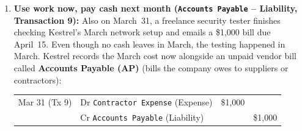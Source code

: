\begin{enumerate}
\begin{center}
\begin{tabular}{@{}llrr@{}}
                & \quad Cr \texttt{Cash} (Asset) & & \$1,200
  \end{tabular}
  \end{center}
  Each month starting in April, \$100 of coverage expires: Kestrel will Debit \texttt{Insurance Expense} \$100 and Credit \texttt{Prepaid Expenses} \$100.
  \item \textbf{Use work now, pay cash next month (\texttt{Accounts Payable} -- Liability, Transaction 9):} Also on March~31, a freelance security tester finishes checking Kestrel's March network setup and emails a \$1,000 bill due April~15. Even though no cash leaves in March, the testing happened in March. Kestrel records the March cost now alongside an unpaid vendor bill called \textbf{Accounts Payable (AP)} (bills the company owes to suppliers or contractors):
  \begin{center}
  \small
  \begin{tabular}{@{}llrr@{}}
  Mar 31 (Tx 9) & Dr \texttt{Contractor Expense} (Expense) & \$1,000 & \\
                & \quad Cr \texttt{Accounts Payable} (Liability) & & \$1,000
  \end{tabular}
  \end{center}
\end{enumerate}

